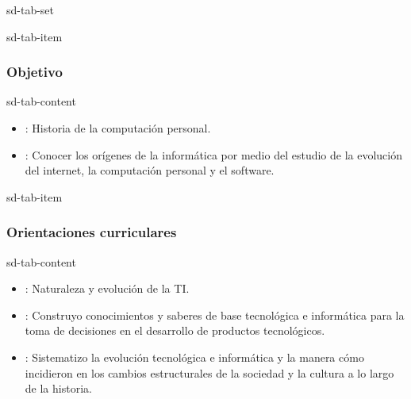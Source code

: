 \documentclass[letterpaper,10pt,spanish]{sphinxmanual}
\begin{document}
\begin{sphinxuseclass}{sd-tab-set}
\begin{sphinxuseclass}{sd-tab-item}\subsubsection*{Objetivo}

\begin{sphinxuseclass}{sd-tab-content}
\sphinxAtStartPar
{}
\begin{itemize}
\item {} 
\sphinxAtStartPar
{}: Historia de la computación personal.

\item {} 
\sphinxAtStartPar
{}: Conocer los orígenes de la informática por medio del estudio de la evolución del internet, la computación personal y el software.

\end{itemize}

\end{sphinxuseclass}
\end{sphinxuseclass}
\begin{sphinxuseclass}{sd-tab-item}\subsubsection*{Orientaciones curriculares}

\begin{sphinxuseclass}{sd-tab-content}\begin{itemize}
\item {} 
\sphinxAtStartPar
{}: Naturaleza y evolución de la TI.

\item {} 
\sphinxAtStartPar
{}: Construyo conocimientos y saberes de base tecnológica e informática para la toma de decisiones en el desarrollo de productos tecnológicos.

\item {} 
\sphinxAtStartPar
{}: Sistematizo la evolución tecnológica e informática y la manera cómo incidieron en los cambios estructurales de la sociedad y la cultura a lo largo de la historia.


\end{itemize}
\end{sphinxuseclass}
\end{sphinxuseclass}
\end{sphinxuseclass}
\end{document}
